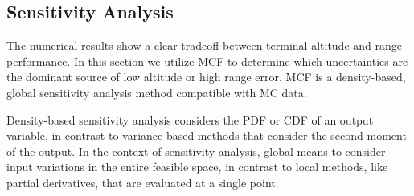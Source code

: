 \subsection{Sensitivity Analysis}
The numerical results show a clear tradeoff between terminal altitude and range performance. In this section we utilize MCF to determine which uncertainties are the dominant source of low altitude or high range error. MCF is a density-based, global sensitivity analysis method compatible with MC data. 

Density-based sensitivity analysis considers the PDF or CDF of an output variable, in contrast to variance-based methods that consider the second moment of the output. 
In the context of sensitivity analysis, global means to consider input variations in the entire feasible space, in contrast to local methods, like partial derivatives, that are evaluated at a single point. 

